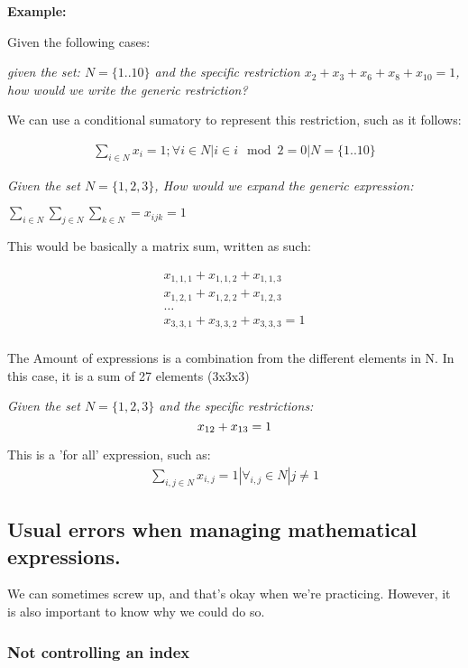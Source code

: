 \documentclass{textbook}
\begin{document}
\textbf{Example: }

Given the following cases:

\textit{given the set: $N = \{1 .. 10\}$ and the specific restriction 
$x_2 + x_3 + x_6 + x_8 + x_10 = 1$, how would we write the generic restriction?
}

We can use a conditional sumatory to represent this restriction, such as it follows:

\begin{gather}
    \sum_{i \in N} x_i = 1 ; \forall i \in N | i \in i \mod 2 = 0 | N = \{ 1 .. 10  \}
\end{gather}

\textit{Given the set $N = \{ 1,2,3 \}$, How would we expand the generic expression:}

$\sum_{i \in N}\sum_{j \in N}\sum_{k \in N} = x_{ijk} = 1$

This would be basically a matrix sum, written as such:

\begin{gather}
    x_{1,1,1} + x_{1,1,2} + x_{1,1,3} \\
    x_{1,2,1} + x_{1,2,2} + x_{1,2,3} \\
    \dots \\
    x_{3,3,1} + x_{3,3,2} + x_{3,3,3} = 1 \\
\end{gather}

The Amount of expressions is a combination from the different elements in N. In this case, it is a sum of
27 elements (3x3x3)

\textit{Given the set $N = \{ 1,2,3 \}$ and the specific restrictions:
$$ x_{12} + x_{13} = 1 \\  $$
} 

This is a 'for all' expression, such as:
\begin{gather}
    \sum_{i , j \in N} x_{i,j} = 1 | \forall_{i,j} \in N | j \neq 1
\end{gather}

\subsection{Usual errors when managing mathematical expressions.}

We can sometimes screw up, and that's okay when we're practicing. However,
it is also important to know why we could do so. 

\subsubsection{Not controlling an index}
\end{document}
